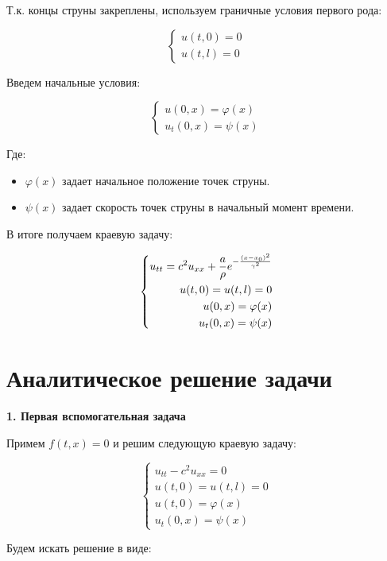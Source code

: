 \documentclass[a4paper]{article}
\begin{document}
Т.к. концы струны закреплены, используем граничные условия первого рода:

$$
    \left\{
        \begin{aligned}
            u(t,0)=0 \\
            u(t,l)=0
        \end{aligned}
    \right.
$$

Введем начальные условия:

$$
    \left\{
        \begin{aligned}
            u(0,x) = \varphi(x) \\
            u_t(0,x) = \psi(x)
        \end{aligned}
    \right.
$$

Где:
\begin{itemize}
    \item $\varphi(x)$ задает начальное положение точек струны.
    \item $\psi(x)$ задает скорость точек струны в начальный момент времени.
\end{itemize}

В итоге получаем краевую задачу:

$$\left\{
    \begin{aligned}
        u_{tt} = c^2u_{xx} + {a \over \rho}e^{-\frac{(x-x_0)^2}{\gamma^2}} \\
        u(t,0) = u(t,l) = 0 \\
        u(0,x) = \varphi(x) \\
        u_t(0,x) = \psi(x)
    \end{aligned}
\right.$$

\newpage

\section{Аналитическое решение задачи}
\textbf{1. Первая вспомогательная задача}

Примем $ f(t,x) = 0 $ и решим следующую краевую задачу:

$$\left\{
    \begin{aligned}
        u_{tt}-c^2u_{xx} = 0 \\
        u(t,0) = u(t,l) = 0  \\
        u(t,0) = \varphi(x)  \\
        u_t(0,x) = \psi(x)
    \end{aligned}
\right.$$

Будем искать решение в виде:
\end{document}
